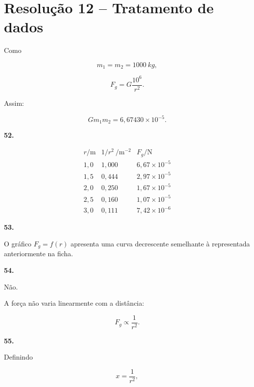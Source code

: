 \documentclass[11pt,a4paper]{article}
\begin{document}
	\section*{Resolução 12 -- Tratamento de dados}
	
	\begin{solucaobox}[Questões 52--56]
		
		Como
		
		\[
		m_1=m_2=\SI{1000}{kg},
		\]
		
		\[
		F_g=
		G\frac{10^6}{r^2}.
		\]
		
		Assim:
		
		\[
		Gm_1m_2
		=
		6{,}67430\times10^{-5}.
		\]
		
		\vspace{3mm}
		
		\textbf{52.}
		
		\[
		\begin{array}{c|c|c}
			r/\mathrm{m}
			&
			1/r^2\ /\mathrm{m^{-2}}
			&
			F_g/\mathrm{N}
			\\
			\hline
			1{,}0 & 1{,}000 & 6{,}67\times10^{-5}\\
			1{,}5 & 0{,}444 & 2{,}97\times10^{-5}\\
			2{,}0 & 0{,}250 & 1{,}67\times10^{-5}\\
			2{,}5 & 0{,}160 & 1{,}07\times10^{-5}\\
			3{,}0 & 0{,}111 & 7{,}42\times10^{-6}
		\end{array}
		\]
		
		\vspace{3mm}
		
		\textbf{53.}
		
		O gráfico $F_g=f(r)$ apresenta uma curva decrescente semelhante à
		representada anteriormente na ficha.
		
		\vspace{3mm}
		
		\textbf{54.}
		
		Não.
		
		A força não varia linearmente com a distância:
		
		\[
		F_g\propto\frac1{r^2}.
		\]
		
		\vspace{3mm}
		
		\textbf{55.}
		
		Definindo
		
		\[
		x=\frac1{r^2},
		\]
		

\end{solucaobox}
\end{document}
